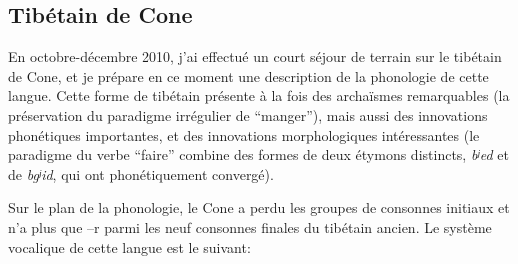 \documentclass[oldfontcommands,oneside,a4paper,11pt]{memoir}
\begin{document}
\subsection{Tibétain de Cone}

En octobre-décembre 2010, j'ai effectué un court séjour de terrain sur le tibétain de Cone, et je prépare en ce moment une description de la phonologie de cette langue. Cette forme de tibétain présente à la fois des archaïsmes remarquables (la préservation du paradigme irrégulier de ``manger''), mais aussi des innovations phonétiques importantes, et des innovations morphologiques intéressantes (le paradigme du verbe ``faire'' combine des formes de deux étymons distincts, \textit{bʲed} et de \textit{bgʲid}, qui ont phonétiquement convergé).

Sur le plan de la phonologie, le Cone a perdu les groupes de consonnes initiaux et n'a plus que --r parmi les neuf consonnes finales du tibétain ancien. Le système vocalique de cette langue est le suivant:
\end{document}
